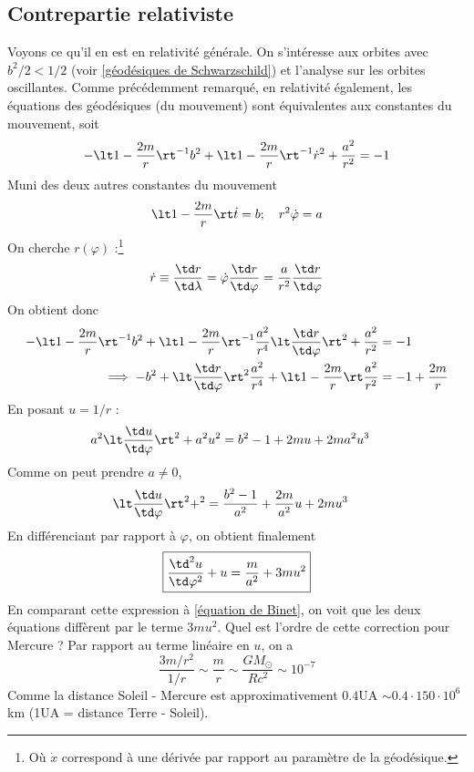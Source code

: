 \subsection{Contrepartie relativiste}
Voyons ce qu'il en est en relativité générale. On s'intéresse aux orbites avec $b^2/2 <1/2$ (voir \ref{géodésiques de Schwarzschild}) et l'analyse sur les orbites oscillantes. Comme précédemment remarqué, en relativité également, les équations des géodésiques (du mouvement) sont équivalentes aux constantes du mouvement, soit
\begin{equation}
    - \lt 1 - \frac{2m}{r} \rt ^{-1} b^2 + \lt 1-\frac{2m}{r} \rt ^{-1} \dot{r}^2 + \frac{a^2}{r^2} = - 1
\end{equation}
Muni des deux autres constantes du mouvement 
\begin{equation}
    \lt 1- \frac{2m}{r} \rt \dot{t} = b ; \quad r^2\dot{\varphi} = a
\end{equation}
On cherche $r(\varphi)$ :\footnote{Où $\dot{x}$ correspond à une dérivée par rapport au paramètre de la géodésique.}
\begin{equation}
    \dot{r} \equiv \frac{\td r}{\td \lambda}= \dot{\varphi} \frac{\td r}{ \td \varphi} =\frac{a}{r^2} \frac{\td r}{\td \varphi}
\end{equation}
On obtient donc
\begin{align}
    - \lt 1 - \frac{2m}{r} \rt^{-1} b^2 + \lt 1- \frac{2m}{r}\rt^{-1} \frac{a^2}{r^4} \lt \frac{\td r}{\td \varphi} \rt^2
    + \frac{a^2}{r^2} &= -1 \\
    \implies -b^2 + \lt \frac{\td r}{\td \varphi} \rt^2 \frac{a^2}{r^4} + \lt 1 - \frac{2m}{r} \rt \frac{a^2}{r^2} &= -1 + \frac{2m}{r}
 \end{align}
En posant $u = 1/r$ :
\begin{align}
     a^2\lt \frac{\td u}{\td \varphi} \rt^2  + a^2u^2 &= b^2 -1 + 2mu +2ma^2u^3
\end{align}
Comme on peut prendre $a\neq 0$, 
\begin{align}
     \lt \frac{\td u}{\td \varphi} \rt^2  + ^2 &= \frac{b^2 -1}{a^2} + \frac{2m}{a^2}u +2mu^3
\end{align}
En différenciant par rapport à $\varphi$, on obtient finalement
\begin{align}
    \label{équation de Binet RG}
    \boxed{\frac{\td^2 u}{\td \varphi^2} + u = \frac{m}{a^2} + 3m u^2}
\end{align}
En comparant cette expression à \ref{équation de Binet}, on voit que les deux équations diffèrent par le terme $3mu^2$. Quel est l'ordre de cette correction pour Mercure ? Par rapport au terme linéaire en $u$, on a
\begin{equation}
    \frac{3m/r^2}{1/r} \sim \frac{m}{r} \sim \frac{GM_\odot}{Rc^2} \sim 10^{-7}
\end{equation}
Comme la distance Soleil - Mercure est approximativement $0.4$UA $\sim 0.4 \cdot 150 \cdot 10^6$km (1UA = distance Terre - Soleil).
